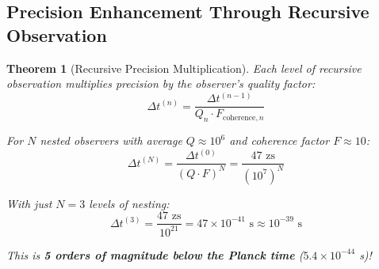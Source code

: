 \documentclass[12pt,a4paper]{article}
\newtheorem{theorem}{Theorem}[section]
\begin{document}
\subsection{Precision Enhancement Through Recursive Observation}

\begin{theorem}[Recursive Precision Multiplication]
Each level of recursive observation multiplies precision by the observer's quality factor:
\begin{equation}
\Delta t^{(n)} = \frac{\Delta t^{(n-1)}}{Q_n \cdot F_{\text{coherence},n}}
\end{equation}

For $N$ nested observers with average $Q \approx 10^6$ and coherence factor $F \approx 10$:
\begin{equation}
\Delta t^{(N)} = \frac{\Delta t^{(0)}}{(Q \cdot F)^N} = \frac{47 \text{ zs}}{(10^7)^N}
\end{equation}

With just $N = 3$ levels of nesting:
\begin{equation}
\Delta t^{(3)} = \frac{47 \text{ zs}}{10^{21}} = 47 \times 10^{-41} \text{ s} \approx 10^{-39} \text{ s}
\end{equation}

This is \textbf{5 orders of magnitude below the Planck time} ($5.4 \times 10^{-44}$ s)!
\end{theorem}
\end{document}
